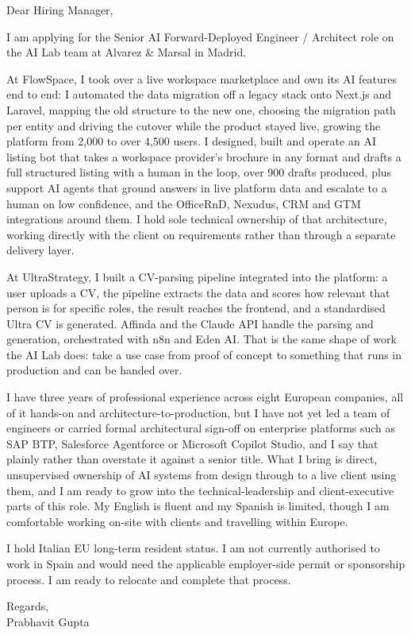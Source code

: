 \documentclass[a4paper,11pt]{article}
\begin{document}
Dear Hiring Manager,

I am applying for the Senior AI Forward-Deployed Engineer / Architect role on the AI Lab team at Alvarez \& Marsal in Madrid.

At FlowSpace, I took over a live workspace marketplace and own its AI features end to end: I automated the data migration off a legacy stack onto Next.js and Laravel, mapping the old structure to the new one, choosing the migration path per entity and driving the cutover while the product stayed live, growing the platform from 2,000 to over 4,500 users. I designed, built and operate an AI listing bot that takes a workspace provider's brochure in any format and drafts a full structured listing with a human in the loop, over 900 drafts produced, plus support AI agents that ground answers in live platform data and escalate to a human on low confidence, and the OfficeRnD, Nexudus, CRM and GTM integrations around them. I hold sole technical ownership of that architecture, working directly with the client on requirements rather than through a separate delivery layer.

At UltraStrategy, I built a CV-parsing pipeline integrated into the platform: a user uploads a CV, the pipeline extracts the data and scores how relevant that person is for specific roles, the result reaches the frontend, and a standardised Ultra CV is generated. Affinda and the Claude API handle the parsing and generation, orchestrated with n8n and Eden AI. That is the same shape of work the AI Lab does: take a use case from proof of concept to something that runs in production and can be handed over.

I have three years of professional experience across eight European companies, all of it hands-on and architecture-to-production, but I have not yet led a team of engineers or carried formal architectural sign-off on enterprise platforms such as SAP BTP, Salesforce Agentforce or Microsoft Copilot Studio, and I say that plainly rather than overstate it against a senior title. What I bring is direct, unsupervised ownership of AI systems from design through to a live client using them, and I am ready to grow into the technical-leadership and client-executive parts of this role. My English is fluent and my Spanish is limited, though I am comfortable working on-site with clients and travelling within Europe.

I hold Italian EU long-term resident status. I am not currently authorised to work in Spain and would need the applicable employer-side permit or sponsorship process. I am ready to relocate and complete that process.

Regards,\\
Prabhavit Gupta
\end{document}
